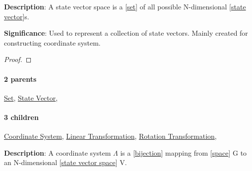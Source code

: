 \documentclass[../main.tex]{subfiles}
\begin{document}
\begin{statement}
\label{statement:State Vector Space}\hspace*{0pt}\par
\end{statement}
\textbf{Description}:
A state vector space is a [\hyperref[statement:Set]{set}] of all possible N-dimensional [\hyperref[statement:State Vector]{state vector}]s.
\par
{\color{magenta} \textbf{Significance}:
Used to represent a collection of state vectors.
Mainly created for constructing coordinate system.
\par}
\begin{proof}
\proofbydefinition
\end{proof}\par
\paragraph{2 parents} \hyperref[statement:Set]{Set}, \hyperref[statement:State Vector]{State Vector}, 
\paragraph{3 children} \hyperref[statement:Coordinate System]{Coordinate System}, \hyperref[statement:Linear Transformation]{Linear Transformation}, \hyperref[statement:Rotation Transformation]{Rotation Transformation}, 



\begin{statement}
\label{statement:Coordinate System}\hspace*{0pt}\par
\end{statement}
\textbf{Description}:
A coordinate system $ \Lambda $ is a [\hyperref[statement:Bijection]{bijection}] mapping from [\hyperref[statement:Space]{space}] G to an N-dimensional [\hyperref[statement:State Vector Space]{state vector space}] V.
\end{document}
